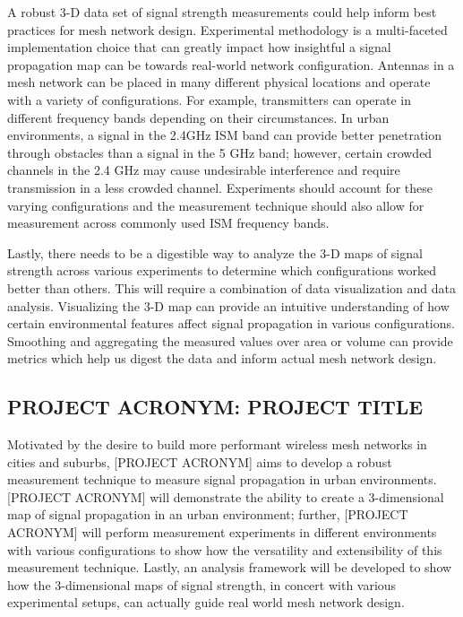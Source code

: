 \documentclass[pageno]{jpaper}
\begin{document}
A robust 3-D data set of signal strength measurements could help inform best practices for mesh network design. Experimental methodology is a  multi-faceted implementation choice that can greatly impact how insightful a signal propagation map can be towards real-world network configuration. Antennas in a mesh network can be placed in many different physical locations and operate with a variety of configurations. For example, transmitters can operate in different frequency bands depending on their circumstances. In urban environments, a signal in the 2.4GHz ISM band can provide better penetration through obstacles than a signal in the 5 GHz band; however, certain crowded channels in the 2.4 GHz may cause undesirable interference and require transmission in a less crowded channel. Experiments should account for these varying configurations and the measurement technique should also allow for measurement across commonly used ISM frequency bands. 

Lastly, there needs to be a digestible way to analyze the 3-D maps of signal strength across various experiments to determine which configurations worked better than others. This will require a combination of data visualization and data analysis. Visualizing the 3-D map can provide an intuitive understanding of how certain environmental features affect signal propagation in various configurations. Smoothing and aggregating the measured values over area or volume can provide metrics which help us digest the data and inform actual mesh network design.

\subsection{PROJECT ACRONYM: PROJECT TITLE}

Motivated by the desire to build more performant wireless mesh networks  in cities and suburbs, [PROJECT ACRONYM] aims to develop a robust measurement technique to measure signal propagation in urban environments. [PROJECT ACRONYM] will demonstrate the ability to create a 3-dimensional map of signal propagation in an urban environment; further, [PROJECT ACRONYM] will perform measurement experiments in different environments with various configurations to show how the versatility and extensibility of this measurement technique. Lastly, an analysis framework will be developed to show how the 3-dimensional maps of signal strength, in concert with various experimental setups, can actually guide real world mesh network design. 
\end{document}
